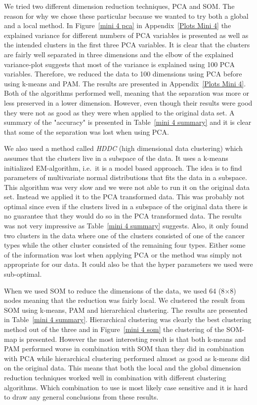 \documentclass[11pt,twoside,swedish]{article}
\begin{document}
We tried two different dimension reduction techniques, PCA and
SOM. The reason for why we chose these particular because we wanted to
try both a global and a local method. In Figure~\ref{mini 4 pca} in
Appendix~\ref{Plots Mini 4} the explained variance for different
numbers of PCA variables is presented as well as the intended clusters
in the first three PCA variables. It is clear that the clusters are
fairly well separated in three dimensions and the elbow of the
explained variance-plot suggests that most of the variance is
explained using 100 PCA variables. Therefore, we reduced the data to
100 dimensions using PCA before using k-means and PAM. The results are
presented in Appendix~\ref{Plots Mini 4}. Both of the algorithms
performed well, meaning that the separation was more or less preserved
in a lower dimension. However, even though their results were good
they were not as good as they were when applied to the original data
set. A summary of the "accuracy" is presented in Table~\ref{mini 4
  summary} and it is clear that some of the separation was lost when
using PCA.

We also used a method called \emph{HDDC} (high dimensional data
clustering) which assumes that the clusters live in a subspace of the
data. It uses a k-means initialized EM-algorithm, i.e.\ it is a model
based approach. The idea is to find parameters of multivariate normal
distributions that fits the data in a subspace. This algorithm was
very slow and we were not able to run it on the original data
set. Instead we applied it to the PCA transformed data. This was
probably not optimal since even if the clusters lived in a subspace of
the original data there is no guarantee that they would do so in the
PCA transformed data. The results was not very impressive as
Table~\ref{mini 4 summary} suggests. Also, it only found two clusters
in the data where one of the clusters consisted of one of the cancer
types while the other cluster consisted of the remaining four
types. Either some of the information was lost when applying PCA or
the method was simply not appropriate for our data. It could also be
that the hyper parameters we used were sub-optimal.

When we used SOM to reduce the dimensions of the data, we used 64
(8$\times$8) nodes meaning that the reduction was fairly local. We
clustered the result from SOM using k-means, PAM and hierarchical
clustering. The results are presented in Table~\ref{mini 4
  summary}. Hierarchical clustering was clearly the best clustering
method out of the three and in Figure~\ref{mini 4 som} the clustering
of the SOM-map is presented. However the most interesting result is
that both k-means and PAM performed worse in combination with SOM
than they did in combination with PCA while hierarchical clustering
performed almost as good as k-means did on the original data. This
means that both the local and the global dimension reduction
techniques worked well in combination with different clustering
algorithms. Which combination to use is most likely case sensitive and
it is hard to draw any general conclusions from these results.
\end{document}
